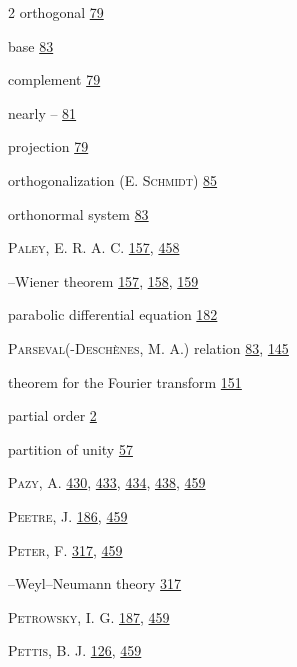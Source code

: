 \begin{multicols}{2}
\noindent orthogonal \hyperlink{page.79}{79}\par
\hspace*{1.1em}base \hyperlink{page.83}{83}\par
\hspace*{1.1em}complement \hyperlink{page.79}{79}\par
\hspace*{1.1em}nearly -- \hyperlink{page.81}{81}\par
\hspace*{1.1em}projection \hyperlink{page.79}{79}\par
\noindent orthogonalization (E. \textsc{Schmidt}) \hyperlink{page.85}{85}\par
\noindent orthonormal system \hyperlink{page.83}{83}\par
\noindent \textsc{Paley}, E. R. A. C. \hyperlink{page.157}{157}, \hyperlink{page.458}{458}\par
\hspace*{1.1em}--Wiener theorem \hyperlink{page.157}{157}, \hyperlink{page.158}{158}, \hyperlink{page.159}{159}\par
\noindent parabolic differential equation \hyperlink{page.182}{182}\par
\noindent \textsc{Parseval}(-\textsc{Deschènes}, M. A.) relation \hyperlink{page.83}{83}, \hyperlink{page.145}{145}\par
\hspace*{1.1em}theorem for the Fourier transform \hyperlink{page.151}{151}\par
\noindent partial order \hyperlink{page.2}{2}\par
\noindent partition of unity \hyperlink{page.57}{57}\par
\noindent \textsc{Pazy}, A. \hyperlink{page.430}{430}, \hyperlink{page.433}{433}, \hyperlink{page.434}{434}, \hyperlink{page.438}{438}, \hyperlink{page.459}{459}\par
\noindent \textsc{Peetre}, J. \hyperlink{page.186}{186}, \hyperlink{page.459}{459}\par
\noindent \textsc{Peter}, F. \hyperlink{page.317}{317}, \hyperlink{page.459}{459}\par
\hspace*{1.1em}--Weyl--Neumann theory \hyperlink{page.317}{317}\par
\noindent \textsc{Petrowsky}, I. G. \hyperlink{page.187}{187}, \hyperlink{page.459}{459}\par
\noindent \textsc{Pettis}, B. J. \hyperlink{page.126}{126}, \hyperlink{page.459}{459}\par

\end{multicols}
